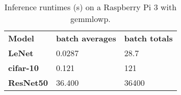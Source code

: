 \begin{table}[]
\centering
\caption[Raspberry Pi inference runtimes (gemmlowp)]{Inference runtimes (s) on a Raspberry Pi 3 with gemmlowp.}
\label{tbl:runtimerpi}
\begin{tabular}{lll}

\textbf{Model}    & \textbf{batch averages}                   & \textbf{batch totals}                  \\
\textbf{LeNet}                      & 0.0287                        & 28.7          \\
\textbf{cifar-10}                 & 0.121                      & 121          \\
\textbf{ResNet50}              & 36.400                 & 36400       
\end{tabular}
\end{table}

